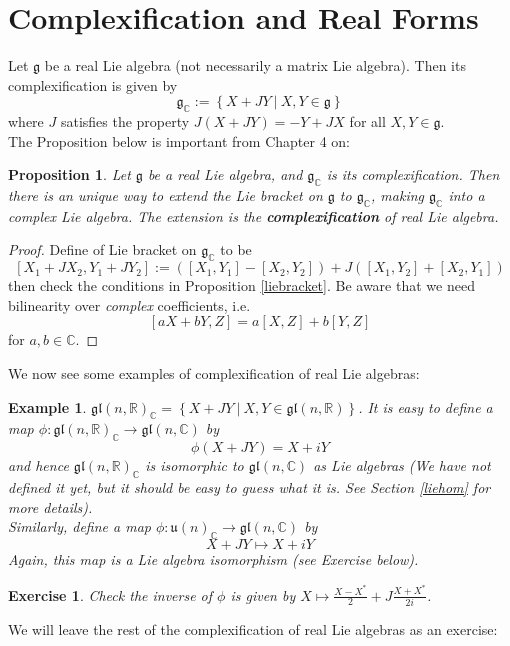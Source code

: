 \documentclass[11pt]{book}
\newtheorem{proposition}[theorem]{Proposition}
\newtheorem{example}[theorem]{Example}
\newtheorem{exercise}[theorem]{Exercise}
\newcommand{\bb}[1]{\mathbb{#1}}
\newcommand{\mf}[1]{\mathfrak{#1}}
\begin{document}
\section{Complexification and Real Forms}
Let $\mf{g}$ be a real Lie algebra (not necessarily a matrix Lie algebra). Then its complexification is given by
$$\mf{g}_{\bb{C}} := \left\{X + JY\ \Big|\ X, Y \in \mf{g} \right\}$$
where $J$ satisfies the property $J(X+JY) = -Y + JX$ for all $X, Y \in \mf{g}$.\\
The Proposition below is important from Chapter 4 on:
\begin{proposition}
Let $\mf{g}$ be a real Lie algebra, and $\mf{g}_{\bb{C}}$ is its complexification. Then there is an unique way to extend the Lie bracket on $\mf{g}$ to $\mf{g}_{\bb{C}}$, making $\mf{g}_{\bb{C}}$ into a complex Lie algebra. The extension is the \textbf{complexification} of real Lie algebra.
\end{proposition}
\begin{proof}
Define of Lie bracket on $\mf{g}_{\bb{C}}$ to be
$$[X_1 + JX_2, Y_1 + JY_2] := ([X_1,Y_1]-[X_2,Y_2]) + J([X_1,Y_2] + [X_2, Y_1])$$
then check the conditions in Proposition \ref{liebracket}. Be aware that we need bilinearity over \textit{complex} coefficients, i.e.
$$[aX+bY, Z] = a[X,Z]+b[Y,Z]$$
for $a, b \in \bb{C}$.
\end{proof}
We now see some examples of complexification of real Lie algebras:
\begin{example}
$\mf{gl}(n,\bb{R})_{\bb{C}} = \left\{ X + JY\ \Big|\ X, Y \in \mf{gl}(n,\bb{R}) \right\}$. It is easy to define a map $\phi: \mf{gl}(n,\bb{R})_{\bb{C}} \to \mf{gl}(n,\bb{C})$ by
$$\phi(X + JY) = X  + iY$$
and hence $\mf{gl}(n,\bb{R})_{\bb{C}}$ is isomorphic to $\mf{gl}(n,\bb{C})$ as Lie algebras (We have not defined it yet, but it should be easy to guess what it is. See Section \ref{liehom} for more details).\\
Similarly, define a map $\phi: \mf{u}(n)_{\bb{C}} \to \mf{gl}(n,\bb{C})$ by
$$X+JY \mapsto X+iY$$
Again, this map is a Lie algebra isomorphism (see Exercise below).
\end{example}
\begin{exercise}
Check the inverse of $\phi$ is given by $X \mapsto \frac{X-X^*}{2} + J\frac{X+X^*}{2i}$.
\end{exercise}
We will leave the rest of the complexification of real Lie algebras as an exercise:
\end{document}
